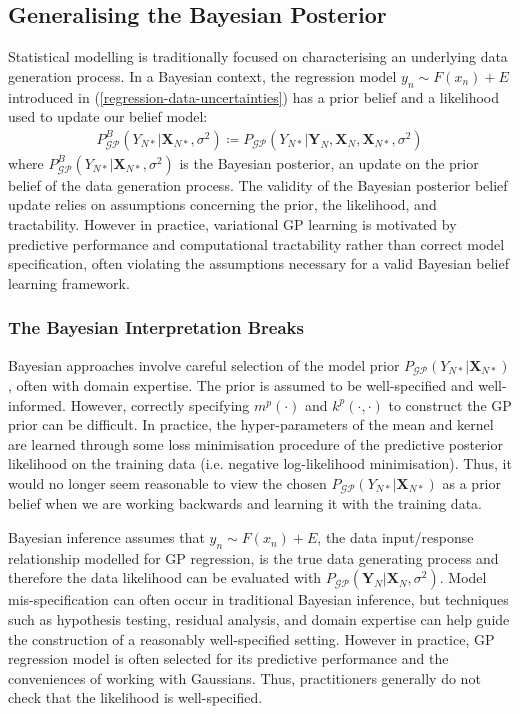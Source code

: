 \documentclass{article}
\newcommand{\GP}{\operatorname{\mathcal{GP}}}
\numberwithin{equation}{section}
\begin{document}
\subsection{Generalising the Bayesian Posterior}
Statistical modelling is traditionally focused on characterising an underlying data generation process. In a Bayesian context, the regression model $y_n \sim F(x_n) + E$ introduced in (\ref{regression-data-uncertainties}) has a prior belief and a likelihood used to update our belief model: 
\begin{align}
\label{bayesian-posterior}
P_{\GP}^B \left(Y_{N*} \vert\mathbf{X}_{N*}, \sigma^2 \right) \coloneqq P_{\GP}\left(Y_{N*} \vert \mathbf{Y}_N, \mathbf{X}_N, \mathbf{X}_{N*}, \sigma^2 \right) 
\end{align}
where $P_{\GP}^B \left(Y_{N*} \vert\mathbf{X}_{N*}, \sigma^2 \right)$ is the Bayesian posterior, an update on the prior belief of the data generation process. The validity of the Bayesian posterior belief update relies on assumptions concerning the prior, the likelihood, and tractability. However in practice, variational GP learning is motivated by predictive performance and computational tractability rather than correct model specification, often violating the assumptions necessary for a valid Bayesian belief learning framework.

\subsubsection{The Bayesian Interpretation Breaks}
Bayesian approaches involve careful selection of the model prior $P_{\GP}(Y_{N*}\vert \mathbf{X}_{N*})$, often with domain expertise. The prior is assumed to be well-specified and well-informed. However, correctly specifying $m^p(\cdot)$ and $k^p(\cdot, \cdot)$ to construct the GP prior can be difficult. In practice, the hyper-parameters of the mean and kernel are learned through some loss minimisation procedure of the predictive posterior likelihood on the training data (i.e. negative log-likelihood minimisation).
Thus, it would no longer seem reasonable to view the chosen $P_{\GP}(Y_{N*}\vert \mathbf{X}_{N*})$ as a prior belief when we are working backwards and learning it with the training data.

 Bayesian inference assumes that $y_n \sim F(x_n) + E$, the data input/response relationship modelled for GP regression, is the true data generating process and therefore the data likelihood can be evaluated with $P_{\GP}\left(\mathbf{Y}_N \vert \mathbf{X}_N, \sigma^2\right)$. Model mis-specification can often occur in traditional Bayesian inference, but techniques such as hypothesis testing, residual analysis, and domain expertise can help guide the construction of a reasonably well-specified setting. However in practice, GP regression model is often selected for its predictive performance and the conveniences of working with Gaussians. Thus, practitioners generally do not check that the likelihood is well-specified. 
 
\end{document}
